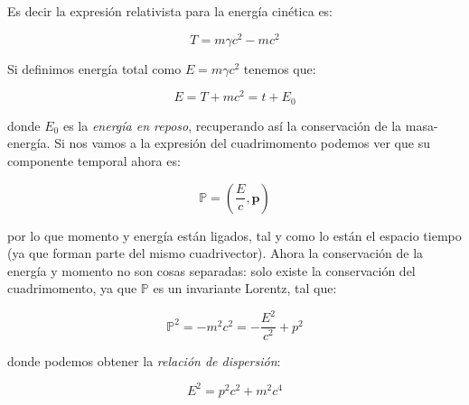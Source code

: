 \documentclass[12pt,a4paper]{book}
\newcommand{\parentesis}[1]{\left( #1  \right)}
\begin{document}
Es decir la expresión relativista para la energía cinética es:

\begin{equation}
T = m \gamma c^2 - mc^2
\end{equation}

Si definimos energía total como $E = m \gamma c^2$ tenemos que:

\begin{equation}
E = T + mc^2 = t + E_0
\end{equation}

donde $E_0$ es la \textit{energía en reposo}, recuperando así la conservación de la masa-energía. Si nos vamos a la expresión del cuadrimomento podemos ver que su componente temporal ahora es:

\begin{equation}
\mathbb{P} = \parentesis{\frac{E}{c}, \mathbf{p}}
\end{equation}

por lo que momento y energía están ligados, tal y como lo están el espacio tiempo (ya que forman parte del mismo cuadrivector). Ahora la conservación de la energía y momento no son cosas separadas: solo existe la conservación del cuadrimomento, ya que $\mathbb{P}$ es un invariante Lorentz, tal que:

\begin{equation}
\mathbb{P}^2 = -m^2 c^2 = - \dfrac{E^2}{c^2} + p^2 
\end{equation}

donde podemos obtener la \textit{relación de dispersión}:

\begin{equation}
E^2 = p^2 c^2 + m^2 c^4
\end{equation}
\end{document}
